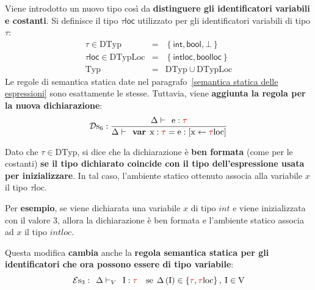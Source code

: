 \documentclass[a4paper]{article}
\begin{document}
	Viene introdotto un nuovo tipo così da \textbf{distinguere gli identificatori variabili e costanti}. Si definisce il tipo $\mathsf{\tau loc}$ utilizzato per gli identificatori variabili di tipo $\tau$:
	\begin{equation*}
		\begin{array}{rll}
			\tau \in \mathrm{DTyp} & = & \left\{\mathsf{int}, \mathsf{bool}, \bot\right\} \\
			\mathsf{\tau loc} \in \mathrm{DTypLoc} & = & \left\{\mathsf{intloc}, \mathsf{boolloc}\right\} \\
			\mathrm{Typ} & = & \mathrm{DTyp} \cup \mathrm{DTypLoc}
		\end{array}
	\end{equation*}
	Le regole di semantica statica date nel paragrafo~\ref{semantica statica delle espressioni} sono esattamente le stesse. Tuttavia, viene \textbf{aggiunta la regola per la nuova dichiarazione}:
	\begin{equation*}
		\mathcal{D}\mathrm{s}_{6} : \dfrac{
			\Delta\vdash \:\: \mathrm{e} : \textcolor{Red3}{\tau}
		}{
			\Delta\vdash \:\: \mathbf{var} \:\: \mathrm{x}:\textcolor{Red3}{\tau} = \mathrm{e} : \left[\mathrm{x} \leftarrow \textcolor{Red3}{\tau} \mathrm{loc}\right]
		}
	\end{equation*}

	\noindent
 	Dato che $\tau \in \mathrm{DTyp}$, si dice che la dichiarazione è \textbf{ben formata} (come per le costanti) \textbf{se il tipo dichiarato coincide con il tipo dell'espressione usata per inizializzare}. In tal caso, l'ambiente statico ottenuto associa alla variabile $x$ il tipo $\tau \mathrm{loc}$.\newline
 	
 	\noindent
 	Per \textcolor{Green4}{\textbf{esempio}}, se viene dichiarata una variabile $x$ di tipo $int$ e viene inizializzata con il valore $3$, allora la dichiarazione è ben formata e l'ambiente statico associa ad $x$ il tipo $intloc$.\newline
 	
 	\noindent
 	Questa modifica \textbf{cambia} anche la \textbf{regola semantica statica per gli identificatori che ora possono essere di tipo variabile}:
 	\begin{equation*}
 		\mathcal{E}\mathrm{s}_{3} : \:\: \Delta \vdash_{V} \:\: \mathrm{I} : \textcolor{Red3}{\tau} \hspace{1em} \mathrm{se} \:\: \Delta\left(\mathrm{I}\right) \in \left\{\textcolor{Red3}{\tau}, \textcolor{Red3}{\tau}\mathrm{loc}\right\}, \: \mathrm{I} \in \mathrm{V}
 	\end{equation*}\newpage
 
\end{document}

